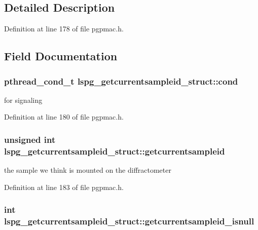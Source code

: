 \subsection{Detailed Description}


Definition at line 178 of file pgpmac.\-h.



\subsection{Field Documentation}
\hypertarget{structlspg__getcurrentsampleid__struct_a289960e45fdc9339a05dc8607f1b7563}{
\subsubsection[{cond}]{\setlength{\rightskip}{0pt plus 5cm}pthread\-\_\-cond\-\_\-t lspg\-\_\-getcurrentsampleid\-\_\-struct\-::cond}}\label{structlspg__getcurrentsampleid__struct_a289960e45fdc9339a05dc8607f1b7563}


for signaling 



Definition at line 180 of file pgpmac.\-h.

\hypertarget{structlspg__getcurrentsampleid__struct_af629de1e076fd6763bccea3547ef24e7}{
\subsubsection[{getcurrentsampleid}]{\setlength{\rightskip}{0pt plus 5cm}unsigned int lspg\-\_\-getcurrentsampleid\-\_\-struct\-::getcurrentsampleid}}\label{structlspg__getcurrentsampleid__struct_af629de1e076fd6763bccea3547ef24e7}


the sample we think is mounted on the diffractometer 



Definition at line 183 of file pgpmac.\-h.

\hypertarget{structlspg__getcurrentsampleid__struct_af370f8d1aaec7dd15121dc65d2a6cfc1}{
\subsubsection[{getcurrentsampleid\-\_\-isnull}]{\setlength{\rightskip}{0pt plus 5cm}int lspg\-\_\-getcurrentsampleid\-\_\-struct\-::getcurrentsampleid\-\_\-isnull}}\label{structlspg__getcurrentsampleid__struct_af370f8d1aaec7dd15121dc65d2a6cfc1}


